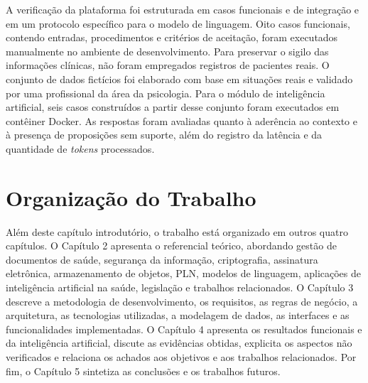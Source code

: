 A verificação da plataforma foi estruturada em casos funcionais e de integração e em um protocolo específico para o modelo de linguagem. Oito casos funcionais, contendo entradas, procedimentos e critérios de aceitação, foram executados manualmente no ambiente de desenvolvimento. Para preservar o sigilo das informações clínicas, não foram empregados registros de pacientes reais. O conjunto de dados fictícios foi elaborado com base em situações reais e validado por uma profissional da área da psicologia. Para o módulo de inteligência artificial, seis casos construídos a partir desse conjunto foram executados em contêiner Docker. As respostas foram avaliadas quanto à aderência ao contexto e à presença de proposições sem suporte, além do registro da latência e da quantidade de \textit{tokens} processados.

\section{Organização do Trabalho}

Além deste capítulo introdutório, o trabalho está organizado em outros quatro capítulos. O Capítulo 2 apresenta o referencial teórico, abordando gestão de documentos de saúde, segurança da informação, criptografia, assinatura eletrônica, armazenamento de objetos, PLN, modelos de linguagem, aplicações de inteligência artificial na saúde, legislação e trabalhos relacionados. O Capítulo 3 descreve a metodologia de desenvolvimento, os requisitos, as regras de negócio, a arquitetura, as tecnologias utilizadas, a modelagem de dados, as interfaces e as funcionalidades implementadas. O Capítulo 4 apresenta os resultados funcionais e da inteligência artificial, discute as evidências obtidas, explicita os aspectos não verificados e relaciona os achados aos objetivos e aos trabalhos relacionados. Por fim, o Capítulo 5 sintetiza as conclusões e os trabalhos futuros.

%
%
